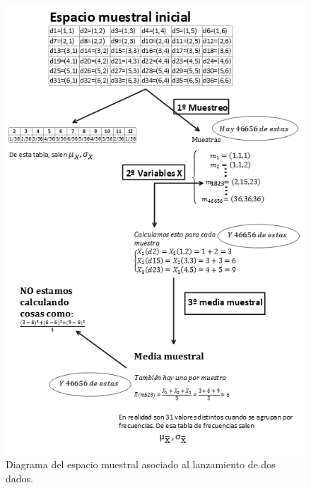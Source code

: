 \begin{ejemplo}
\begin{figure}[p]
\begin{center}
\begin{bn}
\includegraphics[width=13cm]{../fig/cap06-DiagramaMuestreoDosDados-bn.png}
\end{bn}
\caption{Diagrama del espacio muestral asociado  al lanzamiento de  dos dados.}
\label{cap06:fig:EjemploEspacioMuestral2Dados}
\end{center}
\end{figure}




\end{ejemplo}
